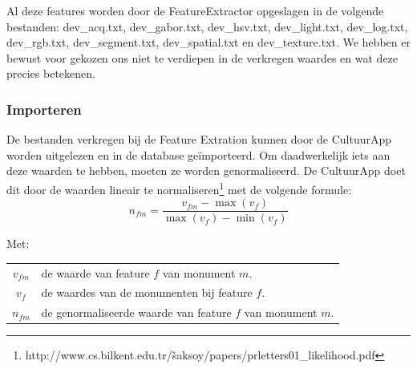 \documentclass[a4paper,10pt]{article}
\begin{document}
		Al deze features worden door de FeatureExtractor opgeslagen in de volgende bestanden: dev\_acq.txt, dev\_gabor.txt, dev\_hsv.txt, dev\_light.txt, dev\_log.txt, dev\_rgb.txt, dev\_segment.txt, dev\_spatial.txt en dev\_texture.txt. We hebben er bewust voor gekozen ons niet te verdiepen in de verkregen waardes en wat deze precies betekenen.
		
		\subsubsection{Importeren}
		De bestanden verkregen bij de Feature Extration kunnen door de CultuurApp worden uitgelezen en in de database ge\"importeerd. Om daadwerkelijk iets aan deze waarden te hebben, moeten ze worden genormaliseerd. De CultuurApp doet dit door de waarden lineair te normaliseren\footnote{http://www.cs.bilkent.edu.tr/\~saksoy/papers/prletters01\_likelihood.pdf} met de volgende formule:
		\begin{equation}
			n_{fm} = \frac{v_{fm} - \max(v_{f})}{\max(v_{f}) - \min(v_{f})}
		\end{equation}
		
		\noindent Met:
		\begin{center}
			\begin{tabular}{ c | l }
				$v_{fm}$ & de waarde van feature $f$ van monument $m$.\\
				$v_{f}$ & de waardes van de monumenten bij feature $f$.\\
				$n_{fm}$ & de genormaliseerde waarde van feature $f$ van monument $m$.
			\end{tabular}
		\end{center}
		
\end{document}
